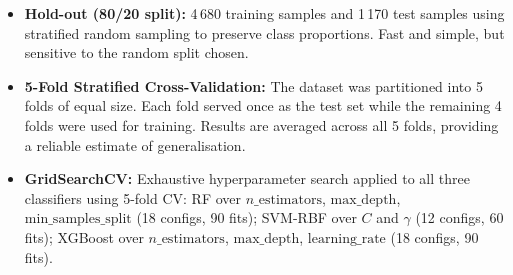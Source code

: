 \begin{itemize}
    \item \textbf{Hold-out (80/20 split):} 4\,680 training samples and 1\,170 test samples
          using stratified random sampling to preserve class proportions. Fast and simple, but
          sensitive to the random split chosen.
    \item \textbf{5-Fold Stratified Cross-Validation:} The dataset was partitioned into 5 folds
          of equal size. Each fold served once as the test set while the remaining 4 folds were
          used for training. Results are averaged across all 5 folds, providing a reliable
          estimate of generalisation.
    \item \textbf{GridSearchCV:} Exhaustive hyperparameter search applied to all three
          classifiers using 5-fold CV: RF over $n\_\mathrm{estimators}$,
          $\mathrm{max\_depth}$, $\mathrm{min\_samples\_split}$ (18 configs, 90 fits);
          SVM-RBF over $C$ and $\gamma$ (12 configs, 60 fits); XGBoost over
          $n\_\mathrm{estimators}$, $\mathrm{max\_depth}$, $\mathrm{learning\_rate}$
          (18 configs, 90 fits).
\end{itemize}
